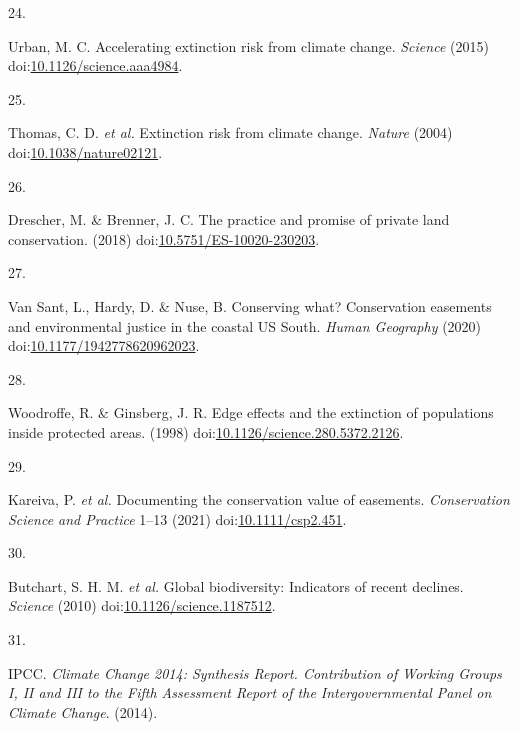 \documentclass[3p]{elsarticle} %
\newlength{\cslhangindent}
\newlength{\csllabelwidth}
\newlength{\cslentryspacingunit} %
\newenvironment{CSLReferences}[2] %
 {%
  \setlength{\parindent}{0pt}
  \ifodd #1
  \let\oldpar\par
  \def\par{\hangindent=\cslhangindent\oldpar}
  \fi
  \setlength{\parskip}{#2\cslentryspacingunit}
 }%
 {}
\newcommand{\CSLLeftMargin}[1]{\parbox[t]{\csllabelwidth}{#1}}
\newcommand{\CSLRightInline}[1]{\parbox[t]{\linewidth - \csllabelwidth}{#1}\break}
\begin{document}
\begin{CSLReferences}{0}{0}
\leavevmode{}%
\CSLLeftMargin{24. }
\CSLRightInline{Urban, M. C. {Accelerating extinction risk from climate
change}. \emph{Science} (2015)
doi:\href{https://doi.org/10.1126/science.aaa4984}{10.1126/science.aaa4984}.}

\leavevmode{}%
\CSLLeftMargin{25. }
\CSLRightInline{Thomas, C. D. \emph{et al.} {Extinction risk from
climate change}. \emph{Nature} (2004)
doi:\href{https://doi.org/10.1038/nature02121}{10.1038/nature02121}.}

\leavevmode{}%
\CSLLeftMargin{26. }
\CSLRightInline{Drescher, M. \& Brenner, J. C. {The practice and promise
of private land conservation}. (2018)
doi:\href{https://doi.org/10.5751/ES-10020-230203}{10.5751/ES-10020-230203}.}

\leavevmode{}%
\CSLLeftMargin{27. }
\CSLRightInline{Van Sant, L., Hardy, D. \& Nuse, B. {Conserving what?
Conservation easements and environmental justice in the coastal US
South}. \emph{Human Geography} (2020)
doi:\href{https://doi.org/10.1177/1942778620962023}{10.1177/1942778620962023}.}

\leavevmode{}%
\CSLLeftMargin{28. }
\CSLRightInline{Woodroffe, R. \& Ginsberg, J. R. {Edge effects and the
extinction of populations inside protected areas}. (1998)
doi:\href{https://doi.org/10.1126/science.280.5372.2126}{10.1126/science.280.5372.2126}.}

\leavevmode{}%
\CSLLeftMargin{29. }
\CSLRightInline{Kareiva, P. \emph{et al.} {Documenting the conservation
value of easements}. \emph{Conservation Science and Practice} 1--13
(2021) doi:\href{https://doi.org/10.1111/csp2.451}{10.1111/csp2.451}.}

\leavevmode{}%
\CSLLeftMargin{30. }
\CSLRightInline{Butchart, S. H. M. \emph{et al.} {Global biodiversity:
Indicators of recent declines}. \emph{Science} (2010)
doi:\href{https://doi.org/10.1126/science.1187512}{10.1126/science.1187512}.}

\leavevmode{}%
\CSLLeftMargin{31. }
\CSLRightInline{IPCC. \emph{{Climate Change 2014: Synthesis Report.
Contribution of Working Groups I, II and III to the Fifth Assessment
Report of the Intergovernmental Panel on Climate Change}}. (2014).}

\end{CSLReferences}
\end{document}
